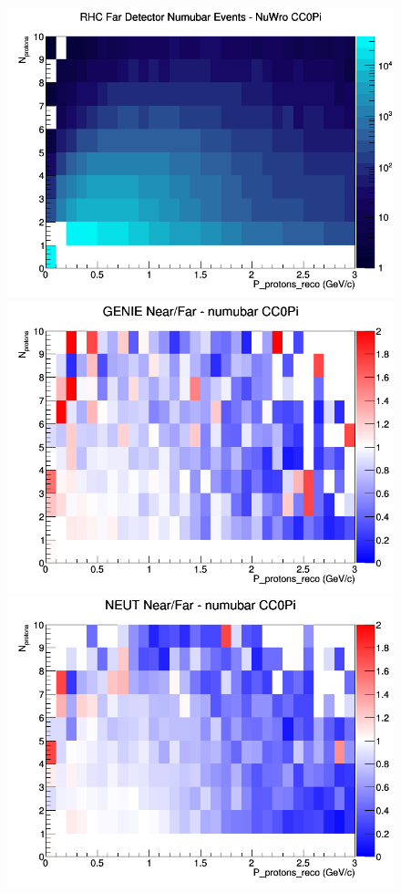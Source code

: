 \begin{figure}[h]
\endminipage
{}
\includegraphics[width=\linewidth]{eff_N_P/LAr/protons/CC0Pi_RHC_FD_numubar_N_P_NuWro.png}
\endminipage
\newline
{}
\includegraphics[width=\linewidth]{eff_N_P/LAr/protons/ratios/CC0Pi_GENIE_numubar_NF_N_P.png}
\endminipage
{}
\includegraphics[width=\linewidth]{eff_N_P/LAr/protons/ratios/CC0Pi_NEUT_numubar_NF_N_P.png}

\end{figure}
